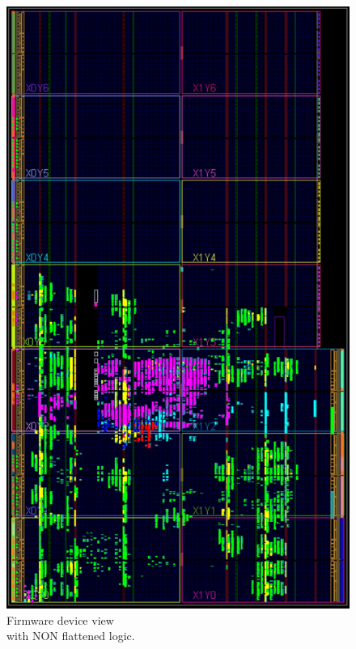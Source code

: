 \begin{figure}[H]
	\centering
	\begin{minipage}{.5\textwidth}
		\centering
		\includegraphics[width=.85\linewidth]{IMG/ch4/FirmwareNOFLAT/DEVICE}
		\caption{Firmware device view \\with NON flattened logic.}
		\label{fig:noflatdevice}
	\end{minipage}%
	\begin{minipage}{.5\textwidth}
		\centering

\end{minipage}
\end{figure}
